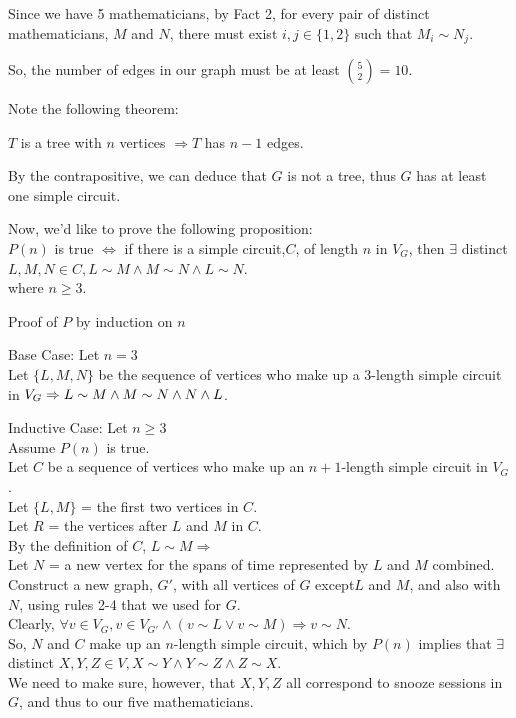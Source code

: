 \documentclass[fleqn]{article}
\begin{document}
Since we have 5 mathematicians, by Fact 2, for every pair of distinct mathematicians, $M$ and $N$, there must exist $i,j \in \lbrace 1,2 \rbrace$ such that $M_i \sim N_j$.

So, the number of edges in our graph must be at least ${5 \choose 2} = 10$.

Note the following theorem:

$T$ is a tree with $n$ vertices $\Rightarrow T$ has $n-1$ edges.

By the contrapositive, we can deduce that $G$ is not a tree, thus $G$ has at least one simple circuit.

Now, we'd like to prove the following proposition:\\
$P(n)$ is true $\Leftrightarrow$ if there is a simple circuit,$C$, of length $n$ in $V_G$, then $\exists$ distinct $ L,M,N \in C,
                        L \sim M \wedge M \sim N \wedge L \sim N$.\\
where $n \geq 3$.

Proof of $P$ by induction on $n$

Base Case: Let $n = 3$\\
Let $\lbrace L, M, N \rbrace$ be the sequence of vertices who make up a 3-length simple circuit in $V_G \Rightarrow\\
L \sim M \wedge M \sim N \wedge N \wedge L$.

Inductive Case: Let $n \geq 3$\\
Assume $P(n)$ is true.\\
Let $C$ be a sequence of vertices who make up an $n+1$-length simple circuit in $V_G$.\\
Let $\lbrace L,M \rbrace$ = the first two vertices in $C$.\\
Let $R$ = the vertices after $L$ and $M$ in $C$.\\
By the definition of $C$, $L \sim M \Rightarrow$\\
Let $N$ = a new vertex for the spans of time represented by $L$ and $M$ combined.\\
Construct a new graph, $G'$, with all vertices of $G$ except$L$ and $M$, and also with $N$, using rules 2-4 that we used for $G$.\\
Clearly, $\forall v \in V_G, v \in V_{G'} \wedge (v \sim L \vee v \sim M)
          \Rightarrow v \sim N$.\\
So, $N$ and $C$ make up an $n$-length simple circuit, which by $P(n)$ implies that $\exists$ distinct $X,Y,Z \in V,
              X \sim Y \wedge Y \sim Z \wedge Z \sim X$.\\
We need to make sure, however, that $X,Y,Z$ all correspond to snooze sessions in $G$, and thus to our five mathematicians.
\end{document}
